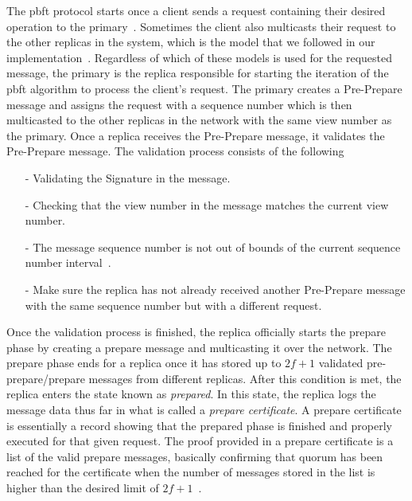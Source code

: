 The \ac{pbft} protocol starts once a client sends a request containing their desired operation to the primary~\cite[p.~4]{PAPER:OGPBFT}. Sometimes the client also multicasts their request to the other replicas in the system, which is the model that we followed in our implementation~\cites[p.~2]{PAPER:DPBFT}[p.~406]{PAPER:PBFTRecovery}[p.~258]{BOOK:BuildDepDistSyst}. Regardless of which of these models is used for the requested message, the primary is the replica responsible for starting the iteration of the \ac{pbft} algorithm to process the client’s request. The primary creates a Pre-Prepare message and assigns the request with a sequence number which is then multicasted to the other replicas in the network with the same view number as the primary. Once a replica receives the Pre-Prepare message, it validates the Pre-Prepare message. The validation process consists of the following~\cites{SLIDES:PBFT}[p.~4]{PAPER:OGPBFT}[p.~259]{BOOK:BuildDepDistSyst}
\begin{itemize}
	\item[-]Validating the Signature in the message.
	\item[-]Checking that the view number in the message matches the current view number.
	\item[-]The message sequence number is not out of bounds of the current sequence number interval~\cites{SLIDES:PBFT}[p.~4]{PAPER:OGPBFT}.
	\item[-]Make sure the replica has not already received another Pre-Prepare message with the same sequence number but with a different request.
\end{itemize}
Once the validation process is finished, the replica officially starts the prepare phase by creating a prepare message and multicasting it over the network. The prepare phase ends for a replica once it has stored up to $2f+1$ validated pre-prepare/prepare messages from different replicas. After this condition is met, the replica enters the state known as \emph{prepared}. In this state, the replica logs the message data thus far in what is called a \emph{prepare certificate}. A prepare certificate is essentially a record showing that the prepared phase is finished and properly executed for that given request. The proof provided in a prepare certificate is a list of the valid prepare messages, basically confirming that quorum has been reached for the certificate when the number of messages stored in the list is higher than the desired limit of $2f + 1$~\cites[p.~408]{PAPER:PBFTRecovery}[p.~457]{BOOK:MVstandver3}.
